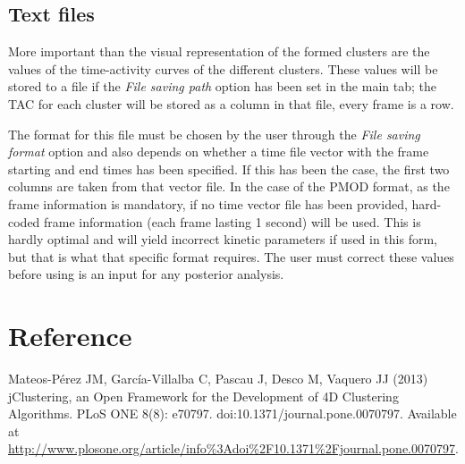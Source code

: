\documentclass[11pt]{article} %
\begin{document}
\subsection{Text files}
\label{subsec:results_text}

More important than the visual representation of the formed clusters are the values of the time-activity curves of the different
clusters. These values will be stored to a file if the {\em File saving path} option has been set in the main tab; the TAC for
each cluster will be stored as a column in that file, every frame is a row.

The format for this file must be chosen by the user through the {\em File saving format} option and also depends on whether
a time file vector with the frame starting and end times has been specified. If this has been the case, the first two columns
are taken from that vector file. In the case of the PMOD format, as the frame information is mandatory, if no time vector file
has been provided, hard-coded frame information (each frame lasting 1 second) will be used. This is hardly optimal and will yield incorrect kinetic parameters if used in this form, but that is what that specific format requires. The user must correct these values before using is an input for any posterior analysis.

\section{Reference}
\label{sec:reference}

Mateos-Pérez JM, García-Villalba C, Pascau J, Desco M, Vaquero JJ (2013) jClustering, an Open Framework for the Development of 4D Clustering Algorithms. PLoS ONE 8(8): e70797. doi:10.1371/journal.pone.0070797. Available at
\url{http://www.plosone.org/article/info\%3Adoi\%2F10.1371\%2Fjournal.pone.0070797}.
\end{document}
